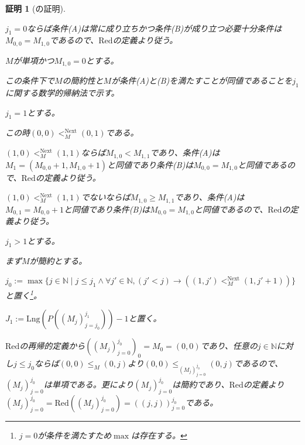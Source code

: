 \documentclass[dvipdfmx,uplatex]{jsarticle}
\newif\iffull
\theoremstyle{customnonumberbreakfortheorem}
\theoremstyle{customnonumberbreakforproof}
\newtheorem{hideableproof}{証明}
\begin{document}
\iffull{それでは本題に戻る。}\fi

\begin{hideableproof}[の証明]
	\begin{indented}
		\item \(j_1 = 0\)ならば条件(A)は常に成り立ちかつ条件(B)が成り立つ必要十分条件は\(M_{0,0} = M_{1,0}\)であるので、\(\textrm{Red}\)の定義より従う。
		\item \(M\)が単項かつ\(M_{1,0} = 0\)とする。
		\begin{indented}
			\item この条件下で\(M\)の簡約性と\(M\)が条件(A)と(B)を満たすことが同値であることを\(j_1\)に関する数学的帰納法で示す。
			\item \(j_1 = 1\)とする。
			\begin{indented}
				\item この時\((0,0) <_M^{\textrm{Next}} (0,1)\)である。
				\item \((1,0) <_M^{\textrm{Next}} (1,1)\)ならば\(M_{1,0} < M_{1,1}\)であり、条件(A)は\(M_1 = (M_{0,0}+1,M_{1,0}+1)\)と同値であり条件(B)は\(M_{0,0} = M_{1,0}\)と同値であるので、\(\textrm{Red}\)の定義より従う。
				\item \((1,0) <_M^{\textrm{Next}} (1,1)\)でないならば\(M_{1,0} \geq M_{1,1}\)であり、条件(A)は\(M_{0,1} = M_{0,0}+1\)と同値であり条件(B)は\(M_{0,0} = M_{1,0}\)と同値であるので、\(\textrm{Red}\)の定義より従う。
			\end{indented}
			\item \(j_1 > 1\)とする。
			\begin{indented}
				\item まず\(M\)が簡約とする。
				\begin{indented}
					\item \(j_0 := \max \{j \in \mathbb{N} \mid j \leq j_1 \wedge \forall j' \in \mathbb{N}, (j' < j) \to ((1,j') <_M^{\textrm{Next}} (1,j'+1))\}\)と置く\footnote{\(j = 0\)が条件を満たすため\(\max\)は存在する。}。
					\item \(J_1 := \textrm{Lng}(P((M_j)_{j=j_0}^{j_1}))-1\)と置く。
					\item \(\textrm{Red}\)の再帰的定義から\(((M_j)_{j=0}^{j_0})_0 = M_0 = (0,0)\)であり、任意の\(j \in \mathbb{N}\)に対し\(j \leq j_0\)ならば\((0,0) \leq_M (0,j)\)より\((0,0) \leq_{(M_j)_{j=0}^{j_0}} (0,j)\)であるので、\((M_j)_{j=0}^{j_0}\)は単項である。更により\((M_j)_{j=0}^{j_0}\)は簡約であり、\(\textrm{Red}\)の定義より\((M_j)_{j=0}^{j_0} = \textrm{Red}((M_j)_{j=0}^{j_0}) = ((j,j))_{j=0}^{j_0}\)である。

\end{indented}
\end{indented}
\end{indented}
\end{indented}
\end{hideableproof}
\end{document}
